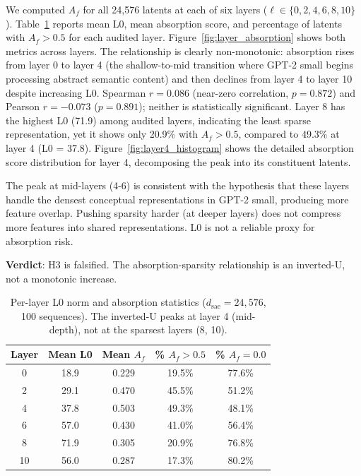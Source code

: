 \documentclass{article}
\begin{document}
We computed $A_f$ for all 24,576 latents at each of six layers ($\ell \in \{0, 2, 4, 6, 8, 10\}$). Table~\ref{tab:layer_stats} reports mean L0, mean absorption score, and percentage of latents with $A_f > 0.5$ for each audited layer. Figure~\ref{fig:layer_absorption} shows both metrics across layers. The relationship is clearly non-monotonic: absorption rises from layer 0 to layer 4 (the shallow-to-mid transition where GPT-2 small begins processing abstract semantic content) and then declines from layer 4 to layer 10 despite increasing L0. Spearman $r = 0.086$ (near-zero correlation, $p = 0.872$) and Pearson $r = -0.073$ ($p = 0.891$); neither is statistically significant. Layer 8 has the highest L0 (71.9) among audited layers, indicating the least sparse representation, yet it shows only 20.9\% with $A_f > 0.5$, compared to 49.3\% at layer 4 (L0 = 37.8). Figure~\ref{fig:layer4_histogram} shows the detailed absorption score distribution for layer 4, decomposing the peak into its constituent latents.

The peak at mid-layers (4-6) is consistent with the hypothesis that these layers handle the densest conceptual representations in GPT-2 small, producing more feature overlap. Pushing sparsity harder (at deeper layers) does not compress more features into shared representations. L0 is not a reliable proxy for absorption risk.

\textbf{Verdict}: H3 is falsified. The absorption-sparsity relationship is an inverted-U, not a monotonic increase.

\begin{table}[t]
\caption{Per-layer L0 norm and absorption statistics ($d_{\text{sae}} = 24{,}576$, 100 sequences). The inverted-U peaks at layer 4 (mid-depth), not at the sparsest layers (8, 10).}
\label{tab:layer_stats}
\centering
\begin{tabular}{ccccc}
\toprule
Layer & Mean L0 & Mean $A_f$ & \% $A_f > 0.5$ & \% $A_f = 0.0$ \\
\midrule
0 & 18.9 & 0.229 & 19.5\% & 77.6\% \\
2 & 29.1 & 0.470 & 45.5\% & 51.2\% \\
4 & 37.8 & 0.503 & 49.3\% & 48.1\% \\
6 & 57.0 & 0.430 & 41.0\% & 56.4\% \\
8 & 71.9 & 0.305 & 20.9\% & 76.8\% \\
10 & 56.0 & 0.287 & 17.3\% & 80.2\% \\
\bottomrule
\end{tabular}
\end{table}
\end{document}
